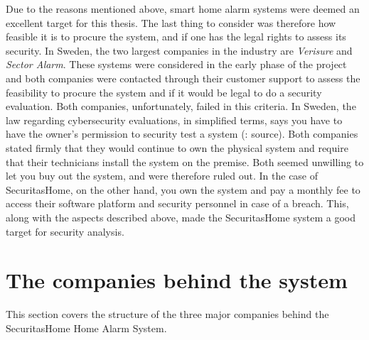 Due to the reasons mentioned above, smart home alarm systems were deemed an excellent target for this thesis. The last thing to consider was therefore how feasible it is to procure the system, and if one has the legal rights to assess its security. In Sweden, the two largest companies in the industry are \textit{Verisure} and \textit{Sector Alarm}. These systems were considered in the early phase of the project and both companies were contacted through their customer support to assess the feasibility to procure the system and if it would be legal to do a security evaluation. Both companies, unfortunately, failed in this criteria. In Sweden, the law regarding cybersecurity evaluations, in simplified terms, says you have to have the owner's permission to security test a system (\todo: source). Both companies stated firmly that they would continue to own the physical system and require that their technicians install the system on the premise. Both seemed unwilling to let you buy out the system, and were therefore ruled out. In the case of SecuritasHome, on the other hand, you own the system and pay a monthly fee to access their software platform and security personnel in case of a breach. This, along with the aspects described above, made the SecuritasHome system a good target for security analysis.

\section{The companies behind the system} \label{ch:system:companies}
This section covers the structure of the three major companies behind the SecuritasHome Home Alarm System.

